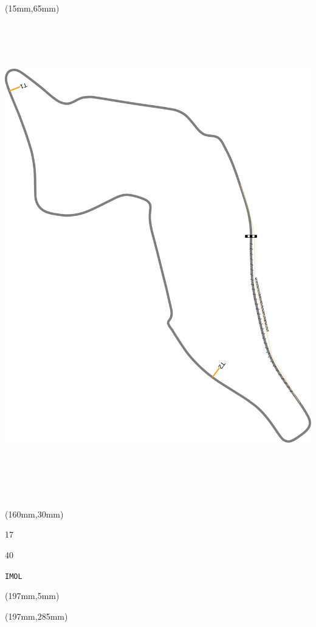 \begin{textblock*}{185mm}(15mm,65mm)%
\centering
\mbox{\includegraphics[width=185mm,height=210mm,keepaspectratio]{PT/IMOL.pdf}}
\end{textblock*}
\begin{textblock*}{40mm}(160mm,30mm)%
\Large
\par{} 
\par17 
\par40 
\par\hfill\tiny\tt IMOL\\
\end{textblock*}
\begin{textblock*}{20mm}(197mm,5mm)%
\fbox{\thepage}
\label{IMOL}
\end{textblock*}
\begin{textblock*}{20mm}(197mm,285mm)%
\fbox{\thepage}
\end{textblock*}

